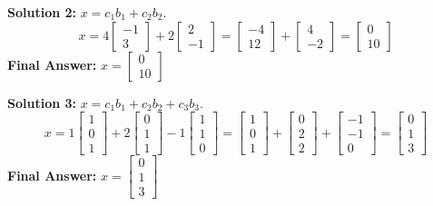 \documentclass{article}
\begin{document}
\vspace{0.3cm}
\textbf{Solution 2:} $x = c_1b_1 + c_2b_2$.
\[ x = 4 \begin{bmatrix} -1 \\ 3 \end{bmatrix} + 2 \begin{bmatrix} 2 \\ -1 \end{bmatrix} = \begin{bmatrix} -4 \\ 12 \end{bmatrix} + \begin{bmatrix} 4 \\ -2 \end{bmatrix} = \begin{bmatrix} 0 \\ 10 \end{bmatrix} \]
\textbf{Final Answer:} $x = \begin{bmatrix} 0 \\ 10 \end{bmatrix}$

\vspace{0.3cm}
\textbf{Solution 3:} $x = c_1b_1 + c_2b_2 + c_3b_3$.
\[ x = 1 \begin{bmatrix} 1 \\ 0 \\ 1 \end{bmatrix} + 2 \begin{bmatrix} 0 \\ 1 \\ 1 \end{bmatrix} - 1 \begin{bmatrix} 1 \\ 1 \\ 0 \end{bmatrix} = \begin{bmatrix} 1 \\ 0 \\ 1 \end{bmatrix} + \begin{bmatrix} 0 \\ 2 \\ 2 \end{bmatrix} + \begin{bmatrix} -1 \\ -1 \\ 0 \end{bmatrix} = \begin{bmatrix} 0 \\ 1 \\ 3 \end{bmatrix} \]
\textbf{Final Answer:} $x = \begin{bmatrix} 0 \\ 1 \\ 3 \end{bmatrix}$
\end{document}
